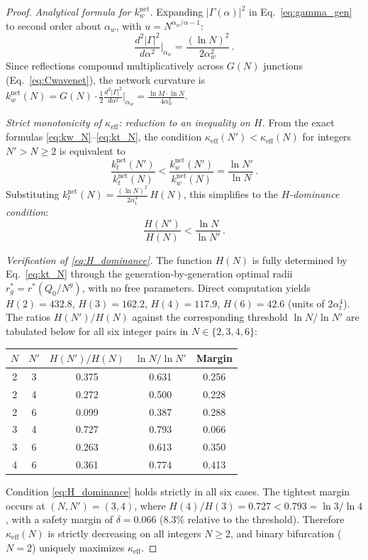 \documentclass[11pt,a4paper]{article}
\theoremstyle{remark}
\begin{document}
\begin{proof}
\emph{Analytical formula for $k_w^\mathrm{net}$.}
Expanding $|\Gamma(\alpha)|^2$ in Eq.~\eqref{eq:gamma_gen} to second order about $\alpha_w$, with $u = N^{\alpha_w/\alpha - 1}$:
\[
  \frac{d^2|\Gamma|^2}{d\alpha^2}\bigg|_{\alpha_w} = \frac{(\ln N)^2}{2\alpha_w^2}\,.
\]
Since reflections compound multiplicatively across $G(N)$ junctions
(Eq.~\eqref{eq:Cwavenet}), the network curvature is $k_w^\mathrm{net}(N) = G(N)
\cdot \frac{1}{2}\frac{d^2|\Gamma|^2}{d\alpha^2}\big|_{\alpha_w} = \frac{\ln M
\cdot \ln N}{4\alpha_w^2}$.

\emph{Strict monotonicity of $\kappa_\mathrm{eff}$: reduction to an inequality on $H$.}
From the exact formulas \eqref{eq:kw_N}--\eqref{eq:kt_N}, the condition
$\kappa_\mathrm{eff}(N') < \kappa_\mathrm{eff}(N)$ for integers $N' > N \ge 2$
is
equivalent to
\[
  \frac{k_t^\mathrm{net}(N')}{k_t^\mathrm{net}(N)}
  < \frac{k_w^\mathrm{net}(N')}{k_w^\mathrm{net}(N)}
  = \frac{\ln N'}{\ln N}\,.
\]
Substituting $k_t^\mathrm{net}(N) = \tfrac{(\ln N)^2}{2\alpha_t^4}\,H(N)$, this
simplifies to the \emph{$H$-dominance condition}:
\begin{equation}
  \frac{H(N')}{H(N)} < \frac{\ln N}{\ln N'}\,.
  \label{eq:H_dominance}
\end{equation}

\emph{Verification of \eqref{eq:H_dominance}.}
The function $H(N)$ is fully determined by Eq.~\eqref{eq:kt_N}
through the generation-by-generation optimal radii $r_g^* = r^*(Q_0/N^g)$,
with no free parameters.
Direct computation yields $H(2)=432.8$, $H(3)=162.2$, $H(4)=117.9$,
$H(6)=42.6$ (units of $2\alpha_t^4$).
The ratios $H(N')/H(N)$ against the corresponding threshold $\ln N/\ln N'$
are tabulated below for all six integer pairs in $N \in \{2,3,4,6\}$:

\begin{center}
\small
\begin{tabular}{@{}ccccc@{}}
\toprule
$N$ & $N'$ & $H(N')/H(N)$ & $\ln N/\ln N'$ & Margin \\
\midrule
2 & 3 & 0.375 & 0.631 & 0.256 \\
2 & 4 & 0.272 & 0.500 & 0.228 \\
2 & 6 & 0.099 & 0.387 & 0.288 \\
3 & 4 & 0.727 & 0.793 & 0.066 \\
3 & 6 & 0.263 & 0.613 & 0.350 \\
4 & 6 & 0.361 & 0.774 & 0.413 \\
\bottomrule
\end{tabular}
\end{center}

Condition \eqref{eq:H_dominance} holds strictly in all six cases.
The tightest margin occurs at $(N,N')=(3,4)$, where
$H(4)/H(3) = 0.727 < 0.793 = \ln 3/\ln 4$,
with a safety margin of $\delta = 0.066$ ($8.3\%$ relative to the threshold).
Therefore $\kappa_\mathrm{eff}(N)$ is strictly decreasing on all integers $N \ge
2$,
and binary bifurcation ($N=2$) uniquely maximizes $\kappa_\mathrm{eff}$.
\end{proof}
\end{document}
